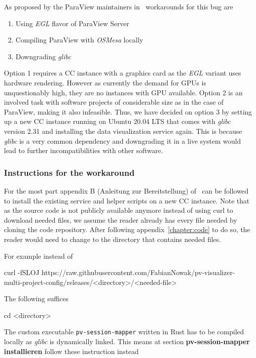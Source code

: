 As proposed by the ParaView maintainers in~\cite{paraviewUsingUbuntu}
workarounds for this bug are

\begin{enumerate}
    \item Using \textit{EGL} flavor of ParaView Server
    \item Compiling ParaView with \textit{OSMesa} locally
    \item Downgrading \textit{glibc}
\end{enumerate}

Option 1 requires a CC instance with a graphics card as the \textit{EGL} variant
uses hardware rendering. However as currently the demand for GPUs is
unquestionably high, they are no instances with GPU available. Option 2 is an
involved task with software projects of considerable size as in the case of
ParaView, making it also infeasible. Thus, we have decided on option 3 by
setting up a new CC instance running on Ubuntu 20.04 LTS that comes with
\textit{glibc} version 2.31 and installing the data visualization service again.
This is because \textit{glibc} is a very common dependency and downgrading it in
a live system would lead to further incompatibilities with other software.

\subsubsection*{Instructions for the workaround}

For the most part appendix B (Anleitung zur Bereitstellung)
of~\cite{nowak2024pvw} can be followed to install the existing service and
helper scripts on a new CC instance. Note that as the source code is not
publicly available anymore instead of using curl to download needed files, we
assume the reader already has every file needed by cloning the code repository.
After following appendix~\ref{chapter:code} to do so, the reader would need to
change to the directory that contains needed files. 

For example instead of
\begin{terminal}
    curl -fSLOJ https://raw.githubusercontent.com/FabianNowak/pv-visualizer-multi-project-config/releases/<directory>/<needed-file>
\end{terminal}

The following suffices
\begin{terminal}
    cd <directory>
\end{terminal}

The custom executable \texttt{pv-session-mapper} written in Rust has to be
compiled locally as \textit{glibc} is dynamically linked. This means at section
\textbf{pv-session-mapper installieren} follow these instruction instead

